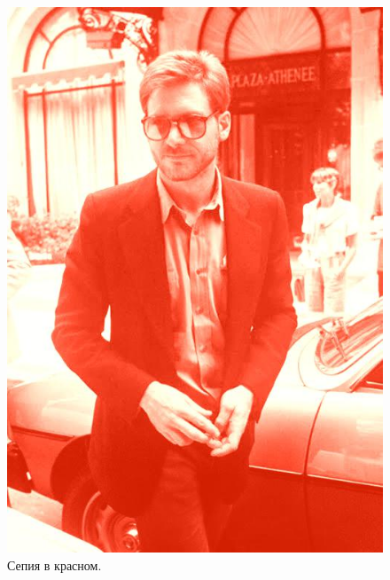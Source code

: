 \documentclass[a4paper,12pt]{article}
\begin{document}
\begin{figure}[h]
\begin{minipage}[h]{0.2\linewidth}
\includegraphics[width=1\linewidth]{Pic_Sepia_red}
Сепия в красном.
\end{minipage}

\vspace{5mm}


\end{figure}
\end{document}
